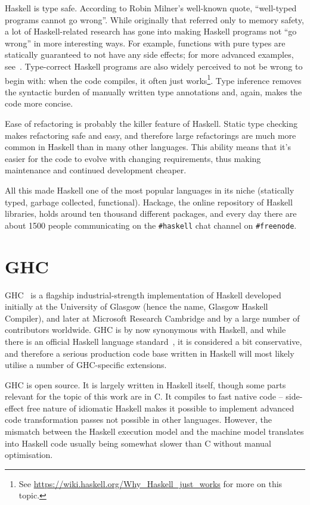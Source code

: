 \documentclass[a4paper,11pt,oneside]{report}
\begin{document}
Haskell is type safe. According to Robin Milner's well-known quote, ``well-typed
programs cannot go wrong''. While originally that referred only to memory
safety, a lot of Haskell-related research has gone into making Haskell programs
not ``go wrong'' in more interesting ways. For example, functions with pure
types are statically guaranteed to not have any side effects; for more advanced
examples, see~\cite{bib:gibbons2003}. Type-correct Haskell programs are also
widely perceived to not be wrong to begin with: when the code compiles, it often
just works\footnote{See \url{https://wiki.haskell.org/Why_Haskell_just_works}
  for more on this topic.}. Type inference removes the syntactic burden of
manually written type annotations and, again, makes the code more concise.

Ease of refactoring is probably the killer feature of Haskell. Static type
checking makes refactoring safe and easy, and therefore large refactorings are
much more common in Haskell than in many other languages. This ability means
that it's easier for the code to evolve with changing requirements, thus making
maintenance and continued development cheaper.

All this made Haskell one of the most popular languages in its niche (statically
typed, garbage collected, functional). Hackage, the online repository of Haskell
libraries, holds around ten thousand different packages, and every day there are
about 1500 people communicating on the \texttt{\#haskell} chat channel on
\texttt{\#freenode}.

\section{GHC}

GHC~\cite{bib:ghc} is a flagship industrial-strength implementation of Haskell
developed initially at the University of Glasgow (hence the name, Glasgow
Haskell Compiler), and later at Microsoft Research Cambridge and by a large
number of contributors worldwide. GHC is by now synonymous with Haskell, and
while there is an official Haskell language standard~\cite{bib:haskell2010}, it
is considered a bit conservative, and therefore a serious production code base
written in Haskell will most likely utilise a number of GHC-specific extensions.

GHC is open source. It is largely written in Haskell itself, though some parts
relevant for the topic of this work are in C. It compiles to fast native code --
side-effect free nature of idiomatic Haskell makes it possible to implement
advanced code transformation passes not possible in other languages. However,
the mismatch between the Haskell execution model and the machine model
translates into Haskell code usually being somewhat slower than C without manual
optimisation.
\end{document}
